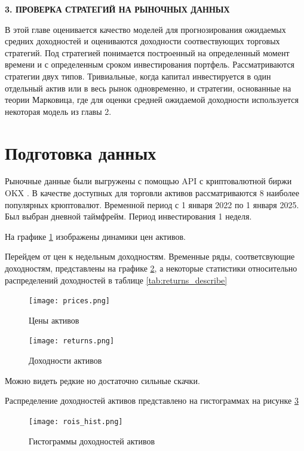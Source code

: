 \newpage
\begin{center}
	\textbf{\large 3. ПРОВЕРКА СТРАТЕГИЙ НА РЫНОЧНЫХ ДАННЫХ}
\end{center}

В этой главе оценивается качество моделей для прогнозирования ожидаемых средних доходностей
и оцениваются доходности соотвествующих торговых стратегий.
Под стратегией понимается построенный на определенный момент времени и с определенным сроком инвестирования
портфель. Рассматриваются стратегии двух типов. Тривиальные, когда капитал инвестируется в один отдельный актив 
или в весь рынок одновременно, и стратегии, основанные на теории Марковица, где для оценки средней ожидаемой 
доходности используется некоторая модель из главы 2.


\section{Подготовка данных}

Рыночные данные были выгружены с помощью API с криптовалютной биржи OKX \cite{okx}.
В качестве доступных для торговли активов рассматриваются 8 наиболее популярных крюптовалют.
Временной период с 1 января 2022 по  1 января 2025.
Был выбран дневной таймфрейм.
Период инвестирования 1 неделя.

На графике \ref{fig:prices} изображены динамики цен активов.

Перейдем от цен к недельным доходностям. Временные ряды, соответсвующие доходностям,
представлены на графике \ref{fig:returns}, а некоторые статистики относительно распределений
доходностей в таблице \ref{tab:returns_describe}



\begin{figure}[H]
	\centering
	\texttt{[image: prices.png]}
	\caption{Цены активов}
	\label{fig:prices}
\end{figure}

\begin{figure}[H]
	\centering
	\texttt{[image: returns.png]}
	\caption{Доходности активов}
	\label{fig:returns}
\end{figure}
Можно видеть редкие но достаточно сильные скачки.

Распределение доходностей активов представлено на гистограммах на рисунке \ref{fig:rois_hist}

\begin{figure}[H]
	\centering
	\texttt{[image: rois\_hist.png]}
	\caption{Гистограммы доходностей активов}
	\label{fig:rois_hist}
\end{figure}

